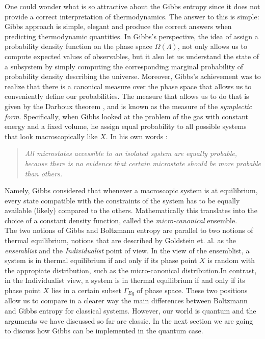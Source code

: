 \indent One could wonder what is so attractive about the Gibbs entropy since it does not provide a correct interpretation of thermodynamics. The answer to this is simple: Gibbs approach is simple, elegant and produce the correct answers when predicting thermodynamic quantities. In Gibbs's perspective, the idea of assign a probability density function on the phase space $\Omega(\Lambda)$, not only allows us to compute expected values of observables, but it also let us understand the state of a subsystem by simply computing the corresponding marginal probability of probability density describing the universe. Moreover, Gibbs's achievement \cite{gibbs_elementary_1902} was to realize that there is a canonical measure over the phase space that allows us to conveniently define our probabilities. The measure that allows us to do that is given by the Darboux theorem \cite{butterfield_symplectic_2007, butterfield_representation_2007}, and is known as the measure of the \textit{symplectic form}. Specifically, when Gibbs looked at the problem of the gas with constant energy and a fixed volume, he assign equal probability to all possible systems that look macroscopically like $X$. In his own words \cite{gibbs_elementary_1902}:
\begin{quote}
\textit{All microstates accessible to an isolated system are equally probable, because there is no evidence that certain microstate should be more probable than others.}
\end{quote}

\indent Namely, Gibbs considered that whenever a macroscopic system is at equilibrium, every state compatible with the constraints of the system has to be equally available (likely) compared to the others. Mathematically this translates into the choice of a constant density function, called the \textit{micro-canonical} ensemble.\\

\indent The two notions of Gibbs and Boltzmann entropy are parallel to two notions of thermal equilibrium, notions that are described by Goldstein et. al.\cite{goldstein_gibbs_2020} as the \textit{ensemblist} and the \textit{Individualist} point of view. In the view of the ensemblist, a system is in thermal equilibrium if and only if its phase point $X$ is random with the appropiate distribution, such as the micro-canonical distribution.In contrast, in the Individualist view, a system is in thermal equilibrium if and only if its phase point $X$ lies in a certain subset $\Gamma_{Eq}$ of phase space. These two positions allow us to compare in a clearer way the main differences between Boltzmann and Gibbs entropy for classical systems. However, our world is quantum and the arguments we have discussed so far are classic. In the next section we are going to discuss how Gibbs can be implemented in the quantum case.

